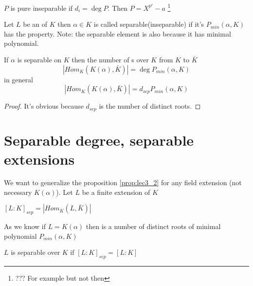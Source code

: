 \begin{definition}
  $P$ is pure inseparable if $d_i = \deg P$.
  Then $P = X^{p^r} - a$
  \footnote{
    ??? For example but not then
  }
  \label{def:deginseppol}
\end{definition}

\begin{definition}
  Let $L$ be an  of $K$ then $\alpha \in K$ is
  called separable(inseparable) if it's
   $P_{min}\left(\alpha, K\right)$ has
  the property.
  Note: the separable element is also 
  because it has minimal polynomial.
  \label{def:degsepelem}
\end{definition}

\begin{proposition}
  If $\alpha$ is separable on $K$ then the number of
  s over $K$ from $K$ to $\bar{K}$
  \[
  \left|Hom_K\left(K\left(\alpha\right), \bar{K}\right)\right| =
  \deg P_{min}\left(\alpha, K\right)
  \]
  in general
  \[
  \left|Hom_K\left(K\left(\alpha\right), \bar{K}\right)\right| =
  d_{sep} P_{min}\left(\alpha, K\right)
  \]  
  \begin{proof}
    It's obvious because $d_{sep}$ is the number of distinct roots.
  \end{proof}
  \label{prop:lec3_2}
\end{proposition}

\section{Separable degree, separable extensions}

We want to generalize the proposition \ref{prop:lec3_2} for any field
extension (not necessary $K\left(\alpha\right)$).
Let $L$ be a finite extension of $K$

\begin{definition}
  $\left[L:K\right]_{sep} = \left|Hom_K\left(L, \bar{K}\right)\right|$  
  \label{def:separabledegree}
\end{definition}

As we know if $L = K\left(\alpha\right)$ then
 is a number of distinct roots of
minimal polynomial $P_{min}\left(\alpha, K\right)$

\begin{definition}
  $L$ is separable over $K$ if
  $\left[L:K\right]_{sep} = \left[L:K\right]$
  \label{def:separableextension}
\end{definition}

